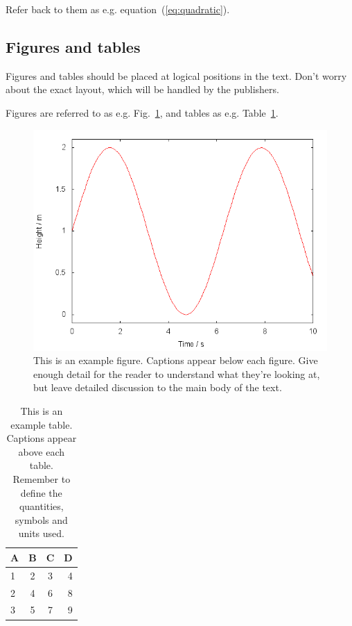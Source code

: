 \documentclass[a4paper,fleqn,usenatbib]{mnras}
\begin{document}
Refer back to them as e.g. equation~(\ref{eq:quadratic}).

\subsection{Figures and tables}

Figures and tables should be placed at logical positions in the text. Don't
worry about the exact layout, which will be handled by the publishers.

Figures are referred to as e.g. Fig.~\ref{fig:example_figure}, and tables as
e.g. Table~\ref{tab:example_table}.

\begin{figure}
	\includegraphics[width=\columnwidth]{example}
    \caption{This is an example figure. Captions appear below each figure.
	Give enough detail for the reader to understand what they're looking at,
	but leave detailed discussion to the main body of the text.}
    \label{fig:example_figure}
\end{figure}


\begin{table}
	\centering
	\caption{This is an example table. Captions appear above each table.
	Remember to define the quantities, symbols and units used.}
	\label{tab:example_table}
	\begin{tabular}{lccr} %
		\hline
		A & B & C & D\\
		\hline
		1 & 2 & 3 & 4\\
		2 & 4 & 6 & 8\\
		3 & 5 & 7 & 9\\
		\hline
	\end{tabular}
\end{table}
\end{document}
